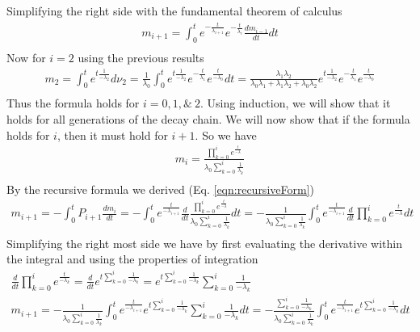 \documentclass[12pt]{article}
\begin{document}
Simplifying the right side with the fundamental theorem of calculus
\begin{equation}
\begin{split}
m_{i+1} = \int_0^t e^{-\frac{t}{\lambda_{i+1}}} e^{-\frac{t}{\lambda_{i}}}\frac{dm_{i-1}}{dt}dt\\
\end{split}
\end{equation}
Now for $i=2$ using the previous results
\begin{equation}
\begin{split}
m_2 = \int_0^t e^{t\frac{1}{-\lambda_2}}d\nu_2 
 = \frac{1}{\lambda_0}\int_0^t e^{t\frac{1}{-\lambda_2}}e^{-\frac{t}{\lambda_{1}}}e^{\frac{t}{-\lambda_0}}dt =
 \frac{\lambda_1\lambda_2}{\lambda_0\lambda_1+\lambda_1\lambda_2+\lambda_0\lambda_2} e^{t\frac{1}{-\lambda_2}}e^{-\frac{t}{\lambda_{1}}}e^{\frac{t}{-\lambda_0}}\\
\end{split}
\end{equation}
Thus the formula holds for $i=0,1,\& \ 2$. Using induction, we will show that it holds for all generations of the decay chain. We will now show that if the formula holds for $i$, then it must hold for $i+1$. 
So we have
\begin{equation}
\begin{split}
m_i = \frac{\prod_{k=0}^ie^{\frac{t}{-\lambda}}}{\lambda_0\sum_{k=0}^i\frac{1}{\lambda_k}}\\
\end{split}
\end{equation}
By the recursive formula we derived (Eq. \ref{eqn:recursiveForm})
\begin{equation}
\begin{split}
m_{i+1} = -\int_0^t P_{i+1}\frac{dm_i}{dt} = -\int_0^t e^{\frac{t}{-\lambda_{i+1}}}\frac{d}{dt}\frac{\prod_{k=0}^ie^{\frac{t}{-\lambda}}}{\lambda_0\sum_{k=0}^i\frac{1}{\lambda_k}}dt = -\frac{1}{\lambda_0\sum_{k=0}^i\frac{1}{\lambda_k}}\int_0^t e^{\frac{t}{-\lambda_{i+1}}}\frac{d}{dt}\prod_{k=0}^ie^{\frac{t}{-\lambda}}dt\\
\end{split}
\end{equation}
Simplifying the right most side we have by first evaluating the derivative within the integral and using the properties of integration
\begin{equation}
\begin{split}
\frac{d}{dt}\prod_{k=0}^ie^{\frac{t}{-\lambda_k}} = \frac{d}{dt}e^{t\sum_{k=0}^i\frac{1}{-\lambda_k}} = e^{t\sum_{k=0}^i\frac{1}{-\lambda_k}}\sum_{k=0}^i\frac{1}{-\lambda_k}\\
m_{i+1} = -\frac{1}{\lambda_0\sum_{k=0}^i\frac{1}{\lambda_k}}\int_0^t e^{\frac{t}{-\lambda_{i+1}}}e^{t\sum_{k=0}^i\frac{1}{-\lambda_k}}\sum_{k=0}^i\frac{1}{-\lambda_k}dt = -\frac{\sum_{k=0}^i\frac{1}{-\lambda_k}}{\lambda_0\sum_{k=0}^i\frac{1}{\lambda_k}}\int_0^t e^{\frac{t}{-\lambda_{i+1}}}e^{t\sum_{k=0}^i\frac{1}{-\lambda_k}}dt
\end{split}
\end{equation}
\end{document}
